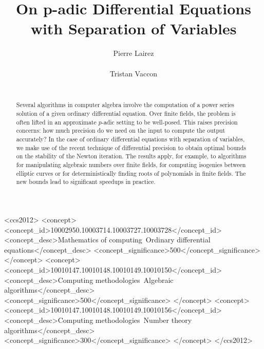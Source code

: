 \documentclass{sig-alternate}
\theoremstyle{definition}
\theoremstyle{remark}
\begin{document}




\title{On {\ttlit p}-adic Differential Equations\\ with Separation of Variables}


\author{\alignauthor
  Pierre Lairez\\
       \\
\alignauthor
Tristan Vaccon\\
        \\
}

\maketitle

\begin{abstract} 
Several algorithms in computer algebra involve the computation of a power series solution of a given ordinary differential equation. Over finite fields, the problem is often lifted in an approximate $p$-adic setting to be well-posed. This raises precision concerns: how much precision do we need on the input to compute the output accurately? In the case of ordinary differential equations with separation of variables, we make use of the recent technique of differential precision to obtain optimal bounds on the stability of the Newton iteration.  The results apply, for example, to algorithms for manipulating algebraic numbers over finite fields, for computing isogenies between elliptic curves or for deterministically finding roots of polynomials in finite fields.  The new bounds lead to significant speedups in practice.
\end{abstract}


\begin{CCSXML}
<ccs2012>
<concept>
<concept_id>10002950.10003714.10003727.10003728</concept_id>
<concept_desc>Mathematics of computing~Ordinary differential equations</concept_desc>
<concept_significance>500</concept_significance>
</concept>
<concept>
<concept_id>10010147.10010148.10010149.10010150</concept_id>
<concept_desc>Computing methodologies~Algebraic algorithms</concept_desc>
<concept_significance>500</concept_significance>
</concept>
<concept>
<concept_id>10010147.10010148.10010149.10010156</concept_id>
<concept_desc>Computing methodologies~Number theory algorithms</concept_desc>
<concept_significance>300</concept_significance>
</concept>
</ccs2012>
\end{CCSXML}
\end{document}
